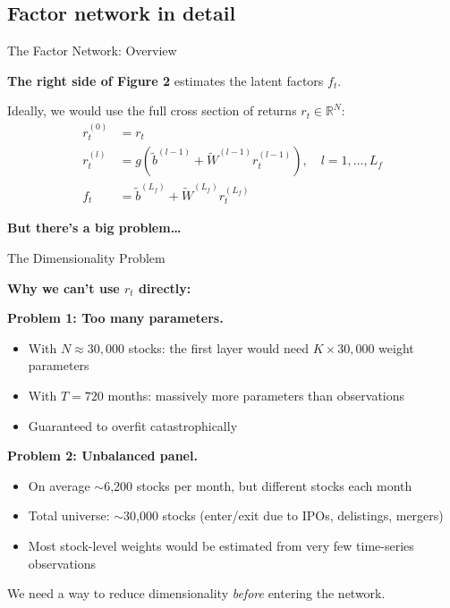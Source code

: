\documentclass[aspectratio=169]{beamer}
\newcommand{\R}{\mathbb{R}}
\begin{document}
\subsection{Factor network in detail}
%
\begin{frame}{The Factor Network: Overview}

\textbf{The right side of Figure 2} estimates the latent factors $f_t$.

\vspace{0.5em}
Ideally, we would use the full cross section of returns $r_t \in \R^N$:
\begin{align}
r^{(0)}_t &= r_t \tag{13}\\
r^{(l)}_t &= g\!\left(\tilde{b}^{(l-1)} + \tilde{W}^{(l-1)} r^{(l-1)}_t\right), \quad l = 1, \ldots, L_f \tag{14}\\
f_t &= \tilde{b}^{(L_f)} + \tilde{W}^{(L_f)} r^{(L_f)}_t \tag{15}
\end{align}

\vspace{0.5em}
\textbf{But there's a big problem\ldots}
\end{frame}
%
%
\begin{frame}{The Dimensionality Problem}

\textbf{Why we can't use $r_t$ directly:}

\vspace{0.5em}
\textbf{Problem 1: Too many parameters.}
\begin{itemize}
    \item With $N \approx 30{,}000$ stocks: the first layer would need $K \times 30{,}000$ weight parameters
    \item With $T = 720$ months: massively more parameters than observations
    \item Guaranteed to overfit catastrophically
\end{itemize}

\vspace{0.5em}
\textbf{Problem 2: Unbalanced panel.}
\begin{itemize}
    \item On average $\sim$6,200 stocks per month, but different stocks each month
    \item Total universe: $\sim$30,000 stocks (enter/exit due to IPOs, delistings, mergers)
    \item Most stock-level weights would be estimated from very few time-series observations
\end{itemize}

\vspace{0.5em}
\begin{alertblock}{We need a way to reduce dimensionality \emph{before} entering the network.}
\end{alertblock}
\end{frame}
\end{document}
